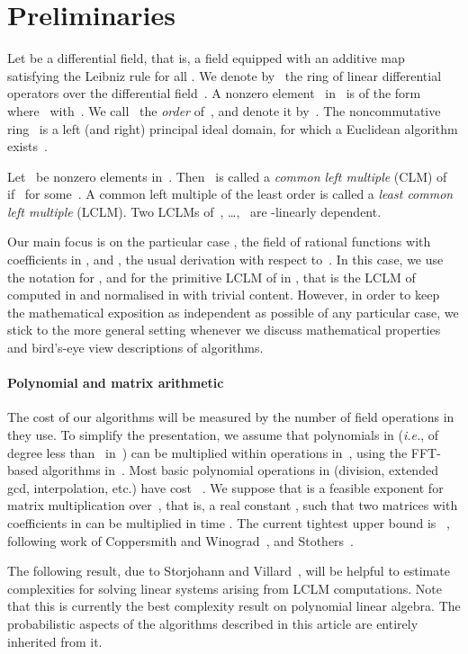 \documentclass{sig-alt-full}
\newcommand{\ie}{{\it i.e.}}
\begin{document}
\section{Preliminaries} \label{SECT:pre} Let  be a differential
field, that is, a field  equipped with an additive map  satisfying the Leibniz rule  for all . We denote by~ the ring of
linear differential operators over the differential field~. 
A nonzero element~ in~ is of the form  where~ with~. We call~ the \emph{order} of~, and denote it
by~.
The
noncommutative ring~ is a left (and right) principal ideal
domain, for which a Euclidean algorithm exists~\cite{Ore32,Ore33}.



Let~ be nonzero elements in~. Then~ is
called a \emph{common left multiple\/} (CLM) of~ if~ for some~. A common
left multiple of the least order is called a \emph{least common left multiple\/} (LCLM). 
Two LCLMs of~, \ldots,~ are -linearly
dependent.

\smallskip
Our main focus is on the particular case , the field of
rational functions with coefficients in , and , the
usual derivation with respect to~. In this case, we use the notation
 for , and 
for the primitive LCLM of  in  ,
that is the LCLM of  computed in  and normalised in  with trivial content.
However, in order to keep the mathematical exposition as independent as
possible of any particular case, we stick to the more general setting  whenever we discuss mathematical properties and bird's-eye view
descriptions of algorithms.

\paragraph*{\bf Polynomial and matrix arithmetic} The cost of our algorithms
will be measured by the number of field operations in  they use. To
simplify the presentation, we assume that polynomials in  (\ie, of degree
less than~ in~) can be multiplied within  operations in~, using the FFT-based algorithms
in~\cite{ScSt71,CaKa91}. Most basic polynomial operations in 
(division, extended gcd, interpolation, etc.) have cost
~\cite{GaGe03}. We suppose that  is a feasible exponent
for matrix multiplication over~, that is, a real constant , such that two  matrices with coefficients in  can be
multiplied in time . The current tightest upper bound is
~\cite{VassilevskaWilliams11}, following work of
Coppersmith and Winograd~\cite{CoWi90}, and Stothers~\cite{Stothers10}.

The following result, due to Storjohann and
Villard~\cite{Storjohann03,StVi05}, will be helpful to estimate complexities
for solving linear systems arising from LCLM computations. Note that this is
currently the best complexity result on polynomial linear algebra. 
The probabilistic aspects of the algorithms described
in this article are entirely inherited from it. 
\end{document}
